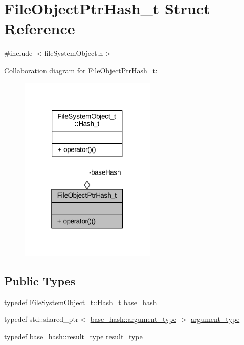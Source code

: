 \hypertarget{struct_file_object_ptr_hash__t}{}\section{File\+Object\+Ptr\+Hash\+\_\+t Struct Reference}
\label{struct_file_object_ptr_hash__t}


{\ttfamily \#include $<$file\+System\+Object.\+h$>$}



Collaboration diagram for File\+Object\+Ptr\+Hash\+\_\+t\+:
\nopagebreak
\begin{figure}[H]
\begin{center}
\leavevmode
\includegraphics[width=184pt]{struct_file_object_ptr_hash__t__coll__graph}
\end{center}
\end{figure}
\subsection*{Public Types}
\begin{DoxyCompactItemize}
\item 
typedef \hyperlink{struct_file_system_object__t_1_1_hash__t}{File\+System\+Object\+\_\+t\+::\+Hash\+\_\+t} \hyperlink{struct_file_object_ptr_hash__t_ad52fb59b8a618654a5c5749fb010824f}{base\+\_\+hash}
\item 
typedef std\+::shared\+\_\+ptr$<$ \hyperlink{struct_file_system_object__t_1_1_hash__t_adae517eced07b62bc5a0fae1d740751a}{base\+\_\+hash\+::argument\+\_\+type} $>$ \hyperlink{struct_file_object_ptr_hash__t_a65b403ca64b6693ccb7f754db69a19e3}{argument\+\_\+type}
\item 
typedef \hyperlink{struct_file_system_object__t_1_1_hash__t_ad9f4d30737281c04f63d62c8a15be2d0}{base\+\_\+hash\+::result\+\_\+type} \hyperlink{struct_file_object_ptr_hash__t_aee959426ba7d87767495fd80f1ca4529}{result\+\_\+type}
\end{DoxyCompactItemize}
